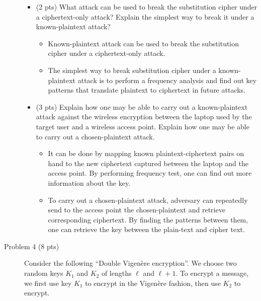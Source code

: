 \documentclass[11pt]{article}
\begin{document}
\begin{description}
\begin{itemize}
 \item (2 pts)
What attack can be used to break the substitution cipher under a ciphertext-only attack?  Explain the
simplest way to break it under a known-plaintext attack?
	\begin{itemize}
	\item
	Known-plaintext attack can be used to break the substitution cipher under a ciphertext-only attack. 
	\item
	The simplest way to break substitution cipher under a known-plaintext attack is to perform a frequency analysis and find out key patterns that translate plaintext to ciphertext in future attacks.  
	\end{itemize}

 \item (3 pts)
Explain how one may be able to carry out a known-plaintext attack against the wireless encryption between the laptop used by the target user and a wireless access point.  Explain how one may be able to carry out a chosen-plaintext attack.
	\begin{itemize}
	\item
	It can be done by mapping known plaintext-ciphertext pairs on hand to the new ciphertext captured between the laptop and the access point. By performing frequency test, one can find out more information about the key.  
	\item
	To carry out a chosen-plaintext attack, adversary can repeatedly send to the access point the chosen-plaintext and retrieve corresponding ciphertext. By finding the patterns between them, one can retrieve the key between the plain-text and cipher text.
	\end{itemize}
\end{itemize}


 \item[Problem 4 (8 pts)]
Consider the following ``Double Vigen\`{e}re encryption''.  We choose two random keys $K_1$ and $K_2$ of lengths $\ell$ and $\ell+1$.  To encrypt a message, we first use key $K_1$ to encrypt in the Vigen\`{e}re fashion, then use $K_2$ to encrypt.


\end{description}
\end{document}

